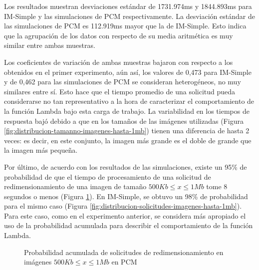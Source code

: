 Los resultados muestran desviaciones estándar de 1731.974ms y 1844.893ms para IM-Simple y las simulaciones de PCM respectivamente. La desviación estándar de las simulaciones de PCM es 112.919ms mayor que la de IM-Simple. Esto indica que la agrupación de los datos con respecto de su media aritmética es muy similar entre ambas muestras.

Los coeficientes de variación de ambas muestras bajaron con respecto a los obtenidos en el primer experimento, aún así, los valores de 0,473 para IM-Simple y de 0,462 para las simulaciones de PCM se consideran heterogéneos, no muy similares entre sí. Esto hace que el tiempo promedio de una solicitud pueda considerarse no tan representativo a la hora de caracterizar el comportamiento de la función Lambda bajo esta carga de trabajo. La variabilidad en los tiempos de respuesta bajó debido a que en los tamaños de las imágenes utilizadas (Figura \ref{fig:distribucion-tamanno-imagenes-hasta-1mb}) tienen una diferencia de hasta 2 veces: es decir, en este conjunto, la imagen más grande es el doble de grande que la imagen más pequeña.

Por último, de acuerdo con los resultados de las simulaciones, existe un 95\% de probabilidad de que el tiempo de procesamiento de una solicitud de redimensionamiento de una imagen de tamaño $500Kb \leq x \leq 1Mb$ tome 8 segundos o menos (Figura \ref{fig:funcion-acumulada-palladio-1mb}). En IM-Simple, se obtuvo un 98\% de probabilidad para el mismo caso (Figura \ref{fig:distribucion-solicitudes-imagenes-hasta-1mb}). Para este caso, como en el experimento anterior, se considera más apropiado el uso de la probabilidad acumulada para describir el comportamiento de la función Lambda.

\begin{figure}
\hspace{-1cm}
\caption{Probabilidad acumulada de solicitudes de redimensionamiento en imágenes $500Kb \leq x \leq 1Mb$ en PCM}
\label{fig:funcion-acumulada-palladio-1mb}
\end{figure}

